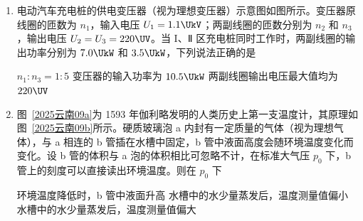 \documentclass[\gkver]{gaokaozhenti}
\begin{document}
\begin{enumerate}
{故 D 正确。

故选 D。
}

\item
电动汽车充电桩的供电变压器（视为理想变压器）示意图如图所示。变压器原线圈的匝数为 $n_{1}$，输入电压 $U_{1} = 1.1 \UkV$；两副线圈的匝数分别为 $n_{2}$ 和 $n_{3}$，输出电压 $U_{2} = U_{3} = 220 \UV$。当 I、Ⅱ 区充电桩同时工作时，两副线圈的输出功率分别为 $7.0 \UkW$ 和 $3.5 \UkW$，下列说法正确的是


{$n_{1}:n_{3} = 1:5$}
{变压器的输入功率为 $10.5 \UkW$}
{两副线圈输出电压最大值均为 $220 \UV$}


\item
图~\ref{2025云南09a}为 1593 年伽利略发明的人类历史上第一支温度计，其原理如图~\ref{2025云南09b}所示。硬质玻璃泡 a 内封有一定质量的气体（视为理想气体），与 a 相连的 b 管插在水槽中固定，b 管中液面高度会随环境温度变化而变化。设 b 管的体积与 a 泡的体积相比可忽略不计，在标准大气压 $p_{0}$ 下，b 管上的刻度可以直接读出环境温度。则在 $p_{0}$ 下


{环境温度降低时，b 管中液面升高}
{水槽中的水少量蒸发后，温度测量值偏小}
{水槽中的水少量蒸发后，温度测量值偏大}


\end{enumerate}
\end{document}
